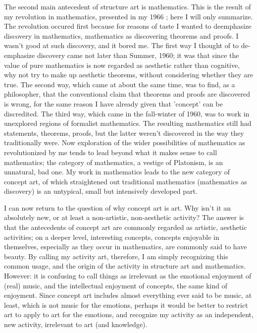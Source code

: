The second main antecedent of structure art is mathematics. This is the 
result of my revolution in mathematics, presented in my 1966 ; here I will only summarize. The revolution occured first because for 
reasons of taste I wanted to deemphasize discovery in mathematics, 
mathematics as discovering theorems and proofs. I wasn't good at such 
discovery, and it bored me. The first way I thought of to de-emphasize 
discovery came not later than Summer, 1960; it was that since the value of 
pure mathematics is now regarded as aesthetic rather than cognitive, why not 
try to make up aesthetic theorems, without considering whether they are 
true. The second way, which came at about the same time, was to find, as a 
philosopher, that the conventional claim that theorems and proofs are 
discovered is wrong, for the same reason I have already given that 'concept' 
can be discredited. The third way, which came in the fall-winter of 1960, 
was to work in unexplored regions of formalist mathematics. The resulting 
mathematics still had statements, theorems, proofs, but the latter weren't 
discovered in the way they traditionally were. Now exploration of the wider 
possibilities of mathematics as revolutionized by me tends to lead beyond 
what it makes sense to call mathematics; the category of mathematics, a 
vestige of Platonism, is an unnatural, bad one. My work in mathematics leads 
to the new category of concept art, of which straightened out traditional 
mathematics (mathematics as discovery) is an untypical, small but 
intensively developed part. 

I can now return to the question of why concept art is art. Why isn't it an 
absolutely new, or at least a non-artistic, non-aesthetic activity? The answer 
is that the antecedents of concept art are commonly regarded as artistic, 
aesthetic activities; on a deeper level, interesting concepts, concepts 
enjoyable in themselves, especially as they occur in mathematics, are 
commonly said to have beauty. By calling my activity art, therefore, I am 
simply recognizing this common usage, and the origin of the activity in 
structure art and mathematics. However: it is confusing to call things as 
irrelevant as the emotional enjoyment of (real) music, and the intellectual 
enjoyment of concepts, the same kind of enjoyment. Since concept art 
includes almost everything ever said to be music, at least, which is not music 
for the emotions, perhaps it would be better to restrict art to apply to art for 
the emotions, and recognize my activity as an independent, new activity, 
irrelevant to art (and knowledge). 

